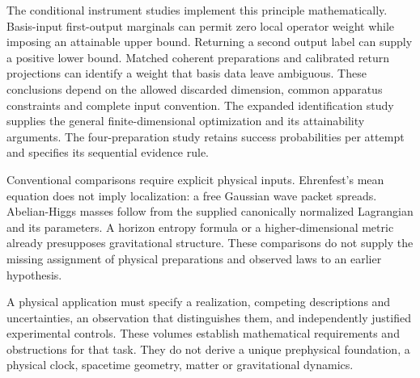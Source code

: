 The conditional instrument studies implement this principle mathematically. Basis-input first-output marginals can permit zero local operator weight while imposing an attainable upper bound. Returning a second output label can supply a positive lower bound. Matched coherent preparations and calibrated return projections can identify a weight that basis data leave ambiguous. These conclusions depend on the allowed discarded dimension, common apparatus constraints and complete input convention. The expanded identification study supplies the general finite-dimensional optimization and its attainability arguments. The four-preparation study retains success probabilities per attempt and specifies its sequential evidence rule.

Conventional comparisons require explicit physical inputs. Ehrenfest's mean equation does not imply localization: a free Gaussian wave packet spreads. Abelian-Higgs masses follow from the supplied canonically normalized Lagrangian and its parameters. A horizon entropy formula or a higher-dimensional metric already presupposes gravitational structure. These comparisons do not supply the missing assignment of physical preparations and observed laws to an earlier hypothesis.

A physical application must specify a realization, competing descriptions and uncertainties, an observation that distinguishes them, and independently justified experimental controls. These volumes establish mathematical requirements and obstructions for that task. They do not derive a unique prephysical foundation, a physical clock, spacetime geometry, matter or gravitational dynamics.
